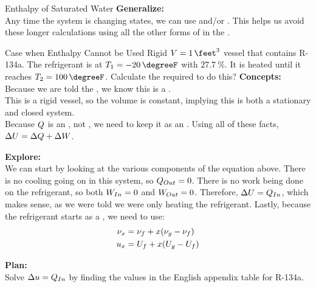 \begin{example}{Enthalpy of Saturated Water}
  \textbf{Generalize:} \\
  Any time the system is changing states, we can use  and/or .
  This helps us avoid these longer calculations using all the other forms of  in the .
\end{example}

\begin{example}{Case when Enthalpy Cannot be Used}
  Rigid $\Volume = \SI{1}{\feet\cubed}$ vessel that contains R-134a.
  The refrigerant is at $\Temp_{1} = \SI{-20}{\degreeF}$ with  $\SI{27.7}{\percent}$.
  It is heated until it reaches $\Temp_{2} = \SI{100}{\degreeF}$.
  Calculate the  required to do this?
  \tcblower{}
  \textbf{Concepts:} \\
  Because we are told the , we know this is a . \\
  This is a rigid vessel, so the volume is constant, implying this is both a stationary and closed system. \\
  Because $Q$ is an , not , we need to keep it as an .
  Using all of these facts, $\Delta U = \Delta Q + \Delta W$.

  \textbf{Explore:} \\
  We can start by looking at the various components of the equation above.
  There is no cooling going on in this system, so $Q_{Out} = 0$.
  There is no work being done on the refrigerant, so both $W_{In} = 0$ and $W_{Out} = 0$.
  Therefore, $\Delta U = Q_{In}$, which makes sense, as we were told we were only heating the refrigerant.
  Lastly, because the refrigerant starts as a , we need to use:
  \begin{align*}
    \nu_{x} &= \nu_{f} + x (\nu_{g} - \nu_{f}) \\
    u_{x} &= U_{f} + x (U_{g} - U_{f})
  \end{align*}

  \textbf{Plan:} \\
  Solve $\Delta u = Q_{In}$ by finding the  values in the English appendix table for R-134a.


\end{example}

